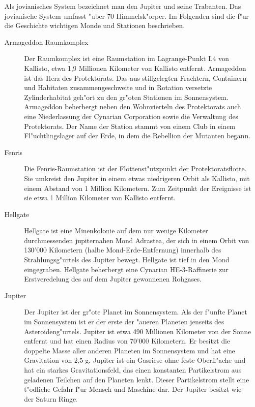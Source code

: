 
Als jovianisches System bezeichnet man den Jupiter und seine Trabanten. Das jovianische System umfasst "uber 70 Himmelsk"orper. Im Folgenden sind die f"ur die Geschichte wichtigen Monde und Stationen beschrieben.

\begin{description}
\item [Armageddon Raumkomplex] Der Raumkomplex ist eine Raumstation im Lagrange-Punkt L4 von Kallisto, etwa 1,9 Millionen Kilometer von 
      Kallisto entfernt. Armageddon ist das Herz des Protektorats. Das aus stillgelegten Frachtern, Containern und Habitaten zusammengeschwei\3te und in Rotation versetzte Zylinderhabitat geh"ort zu den gr"o\3ten Stationen im Sonnensystem. Armageddon beherbergt neben den Wohnvierteln des Protektorats auch eine Niederlassung der Cynarian Corporation sowie die Verwaltung des Protektorats. Der Name der Station stammt von einem Club in einem Fl"uchtlingslager auf der Erde, in dem die Rebellion der Mutanten begann.
\item [Fenris] Die Fenris-Raumstation ist der Flottenst"utzpunkt der Protektoratsflotte. Sie umkreist den Jupiter in einem etwas niedrigeren 
      Orbit als Kallisto, mit einem Abstand von 1 Million Kilometern. Zum Zeitpunkt der Ereignisse ist sie etwa 1 Million Kilometer von Kallisto entfernt.
\item [Hellgate] Hellgate ist eine Minenkolonie auf dem nur wenige Kilometer durchmessenden jupiternahen Mond Adrastea, der sich in einem 
      Orbit von 130'000 Kilometern (halbe Mond-Erde-Entfernung) innerhalb des Strahlungsg"urtels des Jupiter bewegt. Hellgate ist tief in den Mond eingegraben. Hellgate beherbergt eine Cynarian HE-3-Raffinerie zur Erstveredelung des auf dem Jupiter gewonnenen Rohgases. 
\item [Jupiter] Der Jupiter ist der gr"o\3te Planet im Sonnensystem. Als der f"unfte Planet im Sonnensystem ist er der erste der "au\3eren 
      Planeten jenseits des Asteroideng"urtels. Jupiter ist etwa 490 Millionen Kilometer von der Sonne entfernt und hat einen Radius von 70'000 Kilometern. Er besitzt die doppelte Masse aller anderen Planeten im Sonnensystem und hat eine Gravitation von 2,5 g. Jupiter ist ein Gasriese ohne feste Oberfl"ache und hat ein starkes Gravitationsfeld, das einen konstanten Partikelstrom aus geladenen Teilchen auf den Planeten lenkt. Dieser Partikelstrom stellt eine t"odliche Gefahr f"ur Mensch und Maschine dar. Der Jupiter besitzt wie der Saturn Ringe.

\end{description}
